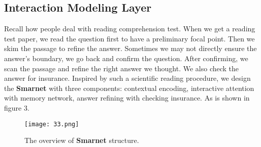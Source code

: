 \documentclass[letterpaper]{article} %
\begin{document}
 \subsection{Interaction Modeling Layer}
 Recall how people deal with reading comprehension test. When we get a reading test paper, we read the question first to have a preliminary focal point. Then we skim the passage to refine the answer. Sometimes we may not directly ensure the answer's boundary, we go back and confirm the question. After confirming, we scan the passage and refine the right answer we thought. We also check the answer for insurance. Inspired by such a scientific reading procedure, we design the \textbf{Smarnet} with three components: contextual encoding, interactive attention with memory network, answer refining with checking insurance. As is shown in figure 3.
 \begin{figure}[t]
 	\centering
 	\texttt{[image: 33.png]}
 	\caption{The overview of \textbf{Smarnet} structure.}
 \end{figure}
\end{document}
